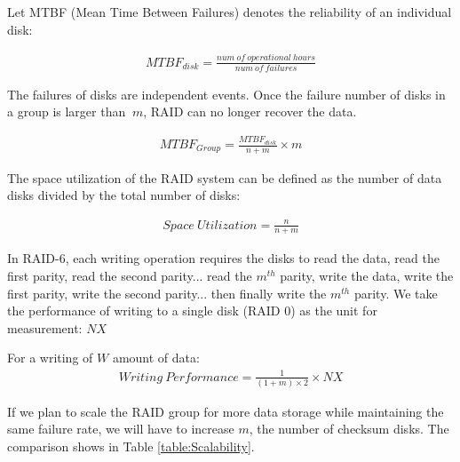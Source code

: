 \documentclass[journal]{IEEEtran}
\begin{document}
Let MTBF (Mean Time Between Failures) denotes the reliability of an individual disk:

\begin{align*}
MTBF_{disk} = \frac{num\ of\ operational\ hours}{num\ of\ failures}
\end{align*}


The failures of disks    are independent events. Once the failure number of disks in a group is larger than \(\ m \), RAID can no longer recover the data.


\begin{align*}
MTBF_{Group} = \frac{MTBF_{disk}}{n + m} \times m
\end{align*}

The space utilization of the RAID system can be defined as the number of data disks divided by the total number of disks:

\begin{align*}
Space\ Utilization = \frac{n}{n+m}
\end{align*}


In RAID-6, each writing operation requires the disks to read the data, read the first parity, read the second parity... read the \( m^{th}\) parity, write the data, write the first parity, write the second parity... then finally write the \( m^{th}\) parity. We take the performance of writing to a single disk (RAID 0) as the unit for measurement: \( NX\)

For a writing of \( W \) amount of data:
\begin{align*}
Writing\ Performance = \frac{1}{(1+m) \times 2} \times NX
\end{align*}

If we plan to scale the RAID group for more data storage while maintaining the same failure rate, we will have to increase \( m \), the number of checksum disks. The comparison shows in Table \ref{table:Scalability}.
\end{document}
